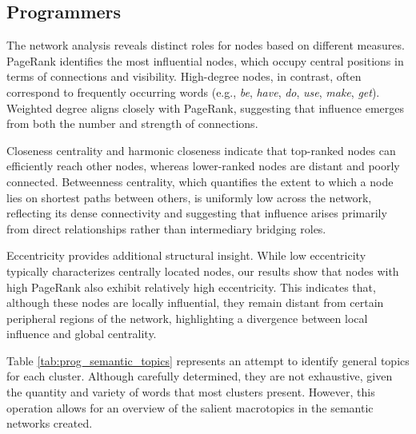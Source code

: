 \documentclass[conference]{IEEEtran}
\begin{document}
\subsection{Programmers}
The network analysis reveals distinct roles for nodes based on different measures. PageRank identifies the most influential nodes, which occupy central positions in terms of connections and visibility. High-degree nodes, in contrast, often correspond to frequently occurring words (e.g., \textit{be}, \textit{have}, \textit{do}, \textit{use}, \textit{make}, \textit{get}). Weighted degree aligns closely with PageRank, suggesting that influence emerges from both the number and strength of connections.

Closeness centrality and harmonic closeness indicate that top-ranked nodes can efficiently reach other nodes, whereas lower-ranked nodes are distant and poorly connected. Betweenness centrality, which quantifies the extent to which a node lies on shortest paths between others, is uniformly low across the network, reflecting its dense connectivity and suggesting that influence arises primarily from direct relationships rather than intermediary bridging roles.

Eccentricity provides additional structural insight. While low eccentricity typically characterizes centrally located nodes, our results show that nodes with high PageRank also exhibit relatively high eccentricity. This indicates that, although these nodes are locally influential, they remain distant from certain peripheral regions of the network, highlighting a divergence between local influence and global centrality.

Table \ref{tab:prog_semantic_topics} represents an attempt to identify general topics for each cluster. Although carefully determined, they are not exhaustive, given the quantity and variety of words that most clusters present. However, this operation allows for an overview of the salient macrotopics in the semantic networks created.
\end{document}
